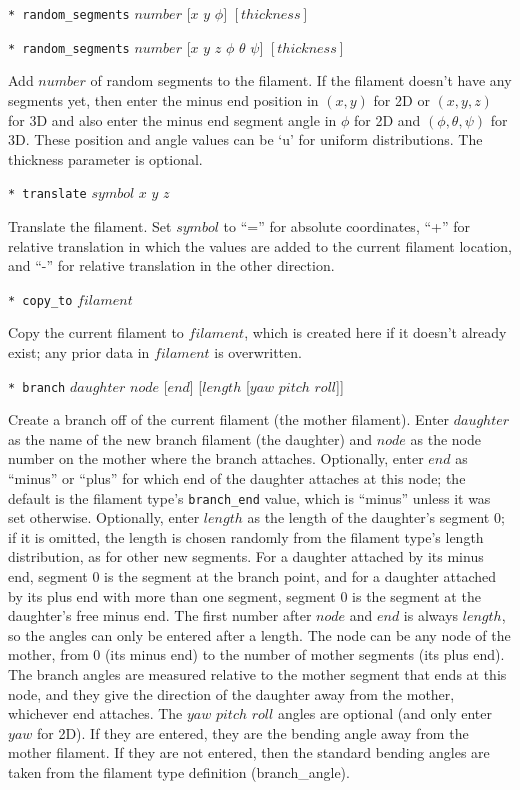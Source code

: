 \documentclass {scrbook}
\newcommand {\ttt} {\texttt}
\begin{document}
\begin{description}
\item{\ttt{* random\_segments} $number$ $[x$ $y$ $\phi]$ $[thickness]$}
\item{\ttt{* random\_segments} $number$ $[x$ $y$ $z$ $\phi$ $\theta$ $\psi]$ $[thickness]$}

Add $number$ of random segments to the filament. If the filament doesn't have any segments yet, then enter the minus end position in $(x,y)$ for 2D or $(x,y,z)$ for 3D and also enter the minus end segment angle in $\phi$ for 2D and $(\phi,\theta,\psi)$ for 3D. These position and angle values can be `u' for uniform distributions. The thickness parameter is optional.

\item{\ttt{* translate} $symbol$ $x$ $y$ $z$}

Translate the filament. Set $symbol$ to ``='' for absolute coordinates, ``+'' for relative translation in which the values are added to the current filament location, and ``-'' for relative translation in the other direction.

\item{\ttt{* copy\_to} $filament$}

Copy the current filament to $filament$, which is created here if it doesn't already exist; any prior data in $filament$ is overwritten.

\item{\ttt{* branch} $daughter$ $node$ [$end$] [$length$ [$yaw$ $pitch$ $roll$]]}

Create a branch off of the current filament (the mother filament). Enter $daughter$ as the name of the new branch filament (the daughter) and $node$ as the node number on the mother where the branch attaches. Optionally, enter $end$ as ``minus'' or ``plus'' for which end of the daughter attaches at this node; the default is the filament type's \ttt{branch\_end} value, which is ``minus'' unless it was set otherwise. Optionally, enter $length$ as the length of the daughter's segment 0; if it is omitted, the length is chosen randomly from the filament type's length distribution, as for other new segments. For a daughter attached by its minus end, segment 0 is the segment at the branch point, and for a daughter attached by its plus end with more than one segment, segment 0 is the segment at the daughter's free minus end. The first number after $node$ and $end$ is always $length$, so the angles can only be entered after a length. The node can be any node of the mother, from 0 (its minus end) to the number of mother segments (its plus end). The branch angles are measured relative to the mother segment that ends at this node, and they give the direction of the daughter away from the mother, whichever end attaches. The $yaw$ $pitch$ $roll$ angles are optional (and only enter $yaw$ for 2D). If they are entered, they are the bending angle away from the mother filament. If they are not entered, then the standard bending angles are taken from the filament type definition (branch\_angle).


\end{description}
\end{document}
